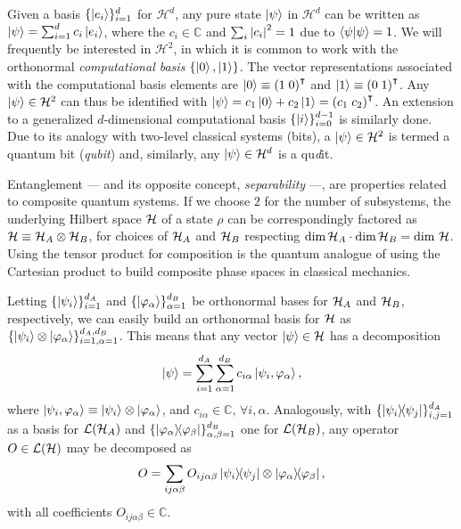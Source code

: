 		Given a basis $\{ \ket{e_i} \}_{i=1}^d$ for $\mathcal{H}^d$, any pure state $\ket{\psi}$ in $\mathcal{H}^d$ can be written as $\ket{\psi} = \sum_{i=1}^d c_i \ket{e_i}$, where the $c_i \in \mathbb{C}$ and $\sum_i \abs{c_i}^2 = 1$ due to $\braket{\psi}{\psi} = 1$. We will frequently be interested in $\mathcal{H}^2$, in which it is common to work with the orthonormal \emph{computational basis} $\{ \ket{0}, \ket{1} \}$. The vector representations associated with the computational basis elements are $\ket{0} \equiv \left( 1 \; 0 \right)^\intercal$ and $\ket{1} \equiv \left( 0 \; 1 \right)^\intercal$. Any $\ket{\psi} \in \mathcal{H}^2$ can thus be identified with $\ket{\psi} = c_1 \ket{0} + c_2 \ket{1} = \left( c_1 \; c_2 \right)^\intercal$. An extension to a generalized $d$-dimensional computational basis $\{ \ket{i} \}_{i=0}^{d-1}$ is similarly done. Due to its analogy with two-level classical systems (bits), a $\ket{\psi} \in \mathcal{H}^{2}$ is termed a quantum bit (\emph{qubit}) and, similarly, any $\ket{\psi} \in \mathcal{H}^{d}$ is a qu\emph{d}it.
	
	
		Entanglement --- and its opposite concept, \emph{separability} ---, are properties related to composite quantum systems. If we choose $2$ for the number of subsystems, the underlying Hilbert space $\mathcal{H}$ of a state $\rho$ can be correspondingly factored as $\mathcal{H} \equiv \mathcal{H}_A \otimes \mathcal{H}_B$, for choices of  $\mathcal{H}_A$ and $\mathcal{H}_B$ respecting $\text{dim} \,\mathcal{H}_A \cdot \text{dim} \,\mathcal{H}_B = \text{dim } \mathcal{H}$. Using the tensor product for composition is the quantum analogue of using the Cartesian product to build composite phase spaces in classical mechanics.
	
		Letting $\{ \ket{ \psi_i } \}_{i=1}^{d_A}$ and $\{ \ket{ \varphi_\alpha } \}_{\alpha=1}^{d_B}$ be orthonormal bases for $\mathcal{H}_A$ and $\mathcal{H}_B$, respectively, we can easily build an orthonormal basis for $\mathcal{H}$ as $\{ \ket{\psi_i} \otimes \ket{\varphi_\alpha} \}_{i=1, \alpha = 1}^{d_A, d_B}$. This means that any vector $\ket{\psi} \in \mathcal{H}$ has a decomposition
		\begin{equation}
			\ket{\psi} = \sum_{i=1}^{d_A}\sum_{\alpha=1}^{d_B} c_{i\alpha} \ket{\psi_i, \varphi_\alpha} ,
			\label{eq:pure-state-decomposition}
		\end{equation}
		where $\ket{\psi_i, \varphi_\alpha} \equiv \ket{\psi_i} \otimes \ket{\varphi_\alpha}$, and $c_{i\alpha} \in \mathbb{C}, \,\forall i, \alpha$. Analogously, with $\{ \ketbra{\psi_i}{\psi_j} \}_{i,j=1}^{d_A}$ as a basis for $\mathcal{L}(\mathcal{H}_A)$ and $\{ \ketbra{\varphi_\alpha}{\varphi_\beta} \}_{\alpha,\beta=1}^{d_B}$ one for $\mathcal{L}(\mathcal{H}_B)$, any operator $O \in \mathcal{L}(\mathcal{H})$ may be decomposed as
		\begin{equation}
			O = \sum_{ij\alpha\beta} O_{ij\alpha\beta} \ketbra{\psi_i}{\psi_j} \otimes \ketbra{\varphi_\alpha}{\varphi_\beta} ,
			\label{eq:decomposed-operator}
		\end{equation}
		with all coefficients $O_{ij\alpha\beta} \in \mathbb{C}$.

